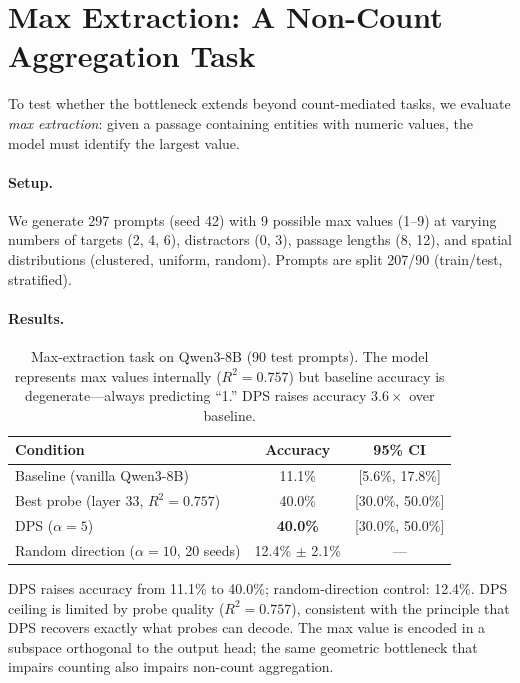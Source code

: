\documentclass{article}
\begin{document}
\appendix

\section{Max Extraction: A Non-Count Aggregation Task}
\label{sec:max_extraction}

To test whether the bottleneck extends beyond count-mediated tasks, we evaluate
\emph{max extraction}: given a passage containing entities with numeric values,
the model must identify the largest value.

\paragraph{Setup.}
We generate 297 prompts (seed 42) with 9 possible max values (1--9) at varying
numbers of targets (2, 4, 6), distractors (0, 3), passage lengths (8, 12),
and spatial distributions (clustered, uniform, random).
Prompts are split 207/90 (train/test, stratified).

\paragraph{Results.}

\begin{table}[h]
\centering
\caption{Max-extraction task on Qwen3-8B (90 test prompts).
The model represents max values internally ($R^2 = 0.757$) but baseline
accuracy is degenerate---always predicting ``1.''
DPS raises accuracy $3.6\times$ over baseline.}
\label{tab:max_extraction}
\begin{tabular}{lcc}
\toprule
Condition & Accuracy & 95\% CI \\
\midrule
Baseline (vanilla Qwen3-8B) & 11.1\% & [5.6\%, 17.8\%] \\
Best probe (layer 33, $R^2{=}0.757$) & 40.0\% & [30.0\%, 50.0\%] \\
DPS ($\alpha=5$) & \textbf{40.0\%} & [30.0\%, 50.0\%] \\
Random direction ($\alpha{=}10$, 20 seeds) & 12.4\% $\pm$ 2.1\% & --- \\
\bottomrule
\end{tabular}
\end{table}

DPS raises accuracy from 11.1\% to 40.0\%; random-direction control: 12.4\%.
DPS ceiling is limited by probe quality ($R^2 = 0.757$), consistent with the
principle that DPS recovers exactly what probes can decode.
The max value is encoded in a subspace orthogonal to the output head;
the same geometric bottleneck that impairs counting also impairs non-count aggregation.
\end{document}
